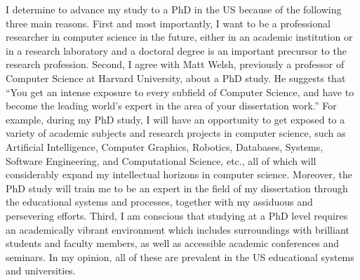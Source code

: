 \documentclass[a4paper,10pt]{report}
\begin{document}
\vspace{0.2cm}
I determine to advance my study to a PhD in the US because of the following three main reasons. First and most importantly, I want to be a professional researcher in computer science in the future, either in an academic institution or in a research laboratory and a doctoral degree is an important precursor to the research profession. Second, I agree with Matt Welsh, previously a professor of Computer Science at Harvard University, about a PhD study. He suggests that ``You get an intense exposure to every subfield of Computer Science, and have to become the leading world's expert in the area of your dissertation work.'' For example, during my PhD study, I will have an opportunity to get exposed to a variety of academic subjects and research projects in computer science, such as Artificial Intelligence, Computer Graphics, Robotics, Databases, Systems, Software Engineering, and Computational Science, etc., all of which will considerably expand my intellectual horizons in computer science. Moreover, the PhD study will train me to be an expert in the field of my dissertation through the educational systems and processes, together with my assiduous and persevering efforts. Third, I am conscious that studying at a PhD level requires an academically vibrant environment which includes surroundings with brilliant students and faculty members, as well as accessible academic conferences and seminars. In my opinion, all of these are prevalent in the US educational systems and universities.
\end{document}
